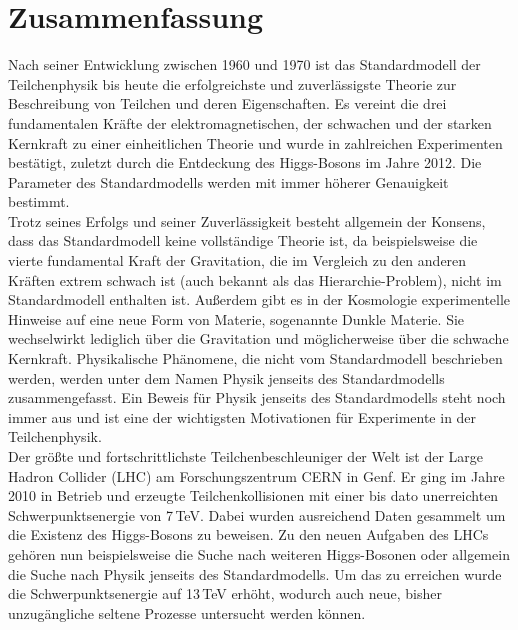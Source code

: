 \chapter*{Zusammenfassung}

Nach seiner Entwicklung zwischen 1960 und 1970 ist das Standardmodell der Teilchenphysik bis heute die erfolgreichste und zuverlässigste Theorie zur Beschreibung von Teilchen und deren Eigenschaften. Es vereint die drei fundamentalen Kräfte der elektromagnetischen, der schwachen und der starken Kernkraft zu einer einheitlichen Theorie und wurde in zahlreichen Experimenten bestätigt, zuletzt durch die Entdeckung des Higgs-Bosons im Jahre 2012. Die Parameter des Standardmodells werden mit immer höherer Genauigkeit bestimmt.\\

Trotz seines Erfolgs und seiner Zuverlässigkeit besteht allgemein der Konsens, dass das Standardmodell keine vollständige Theorie ist, da beispielsweise die vierte fundamental Kraft der Gravitation, die im Vergleich zu den anderen Kräften extrem schwach ist (auch bekannt als das Hierarchie-Problem), nicht im Standardmodell enthalten ist. Außerdem gibt es in der Kosmologie experimentelle Hinweise auf eine neue Form von Materie, sogenannte Dunkle Materie. Sie wechselwirkt lediglich über die Gravitation und möglicherweise über die schwache Kernkraft. Physikalische Phänomene, die nicht vom Standardmodell beschrieben werden, werden unter dem Namen Physik jenseits des Standardmodells zusammengefasst. Ein Beweis für Physik jenseits des Standardmodells steht noch immer aus und ist eine der wichtigsten Motivationen für Experimente in der Teilchenphysik.\\

Der größte und fortschrittlichste Teilchenbeschleuniger der Welt ist der Large Hadron Collider (LHC) am Forschungszentrum CERN in Genf. Er ging im Jahre 2010 in Betrieb und erzeugte Teilchenkollisionen mit einer bis dato unerreichten Schwerpunktsenergie von 7\,TeV. Dabei wurden ausreichend Daten gesammelt um die Existenz des Higgs-Bosons zu beweisen. Zu den neuen Aufgaben des LHCs gehören nun beispielsweise die Suche nach weiteren Higgs-Bosonen oder allgemein die Suche nach Physik jenseits des Standardmodells. Um das zu erreichen wurde die Schwerpunktsenergie auf 13\,TeV erhöht, wodurch auch neue, bisher unzugängliche seltene Prozesse untersucht werden können.\\

